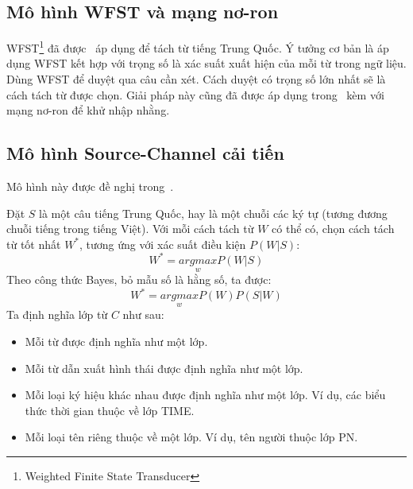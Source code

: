 \documentclass[a4paper,oneside,14pt]{extbook} %
\begin{document}


\subsection{Mô hình WFST và mạng nơ-ron}

WFST\footnote{Weighted Finite State Transducer} đã được~\cite{Sproat}
áp dụng để tách từ tiếng Trung Quốc. Ý tưởng cơ bản là áp dụng WFST
kết hợp với trọng số là xác suất xuất hiện của mỗi từ trong ngữ
liệu. Dùng WFST để duyệt qua câu cần xét. Cách duyệt có  trọng số lớn
nhất sẽ là cách tách từ được chọn. Giải pháp này cũng đã được áp dụng
trong~\cite{Tachtu} kèm với mạng nơ-ron để khử nhập nhằng. 




\subsection{Mô hình Source-Channel cải tiến}

Mô hình này được đề nghị trong~\cite{sc}.

Đặt $S$ là một câu tiếng Trung Quốc, hay là một chuỗi các ký tự (tương
đương chuỗi tiếng trong tiếng Việt). Với mỗi cách tách từ $W$ có thể
có, chọn cách tách từ tốt nhất $W^*$, tương ứng với xác suất điều kiện
$P(W|S)$:
$$W^*=\underset{w}{argmax}P(W|S)$$
Theo công thức Bayes, bỏ mẫu số là hằng số, ta được:
$$W^*=\underset{w}{argmax}P(W)P(S|W)$$
Ta định nghĩa lớp từ $C$ như sau:
\begin{itemize}
\item Mỗi từ được định nghĩa như một lớp.
\item Mỗi từ dẫn xuất hình thái được định nghĩa như một lớp.
\item Mỗi loại ký hiệu khác nhau được định nghĩa như một lớp. Ví dụ, các biểu
  thức thời gian thuộc về lớp TIME.
\item Mỗi loại tên riêng thuộc về một lớp. Ví dụ, tên người thuộc lớp PN.
\end{itemize}
\end{document}
